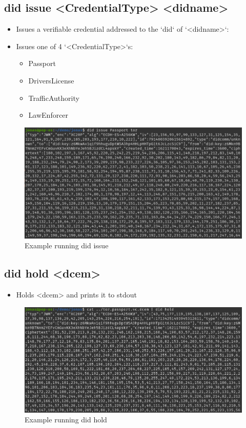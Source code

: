 \newpage



\subsection{did issue <CredentialType> <didname>}
\begin{itemize}
\item Issues a verifiable credential addressed to the `did` of `<didname>`:
\item Issues one of 4 `<CredentialType>`s:
    \begin{itemize}
    \item Passport
    \item DriversLicense
    \item TrafficAuthority
    \item LawEnforcer
    \end{itemize}
\end{itemize}
    \begin{figure}[htbp]
      \centering
      \includegraphics[width=.7\textwidth]{figures/cmd-issue.png}
      \caption[]{Example running did issue}
    \end{figure}



\subsection{did hold <dcem>}
\begin{itemize}
    \item Holds <dcem> and prints it to stdout
\end{itemize}
    \begin{figure}[htbp]
      \centering
      \includegraphics[width=.7\textwidth]{figures/cmd-hold.png}
      \caption[]{Example running did hold}
    \end{figure}

